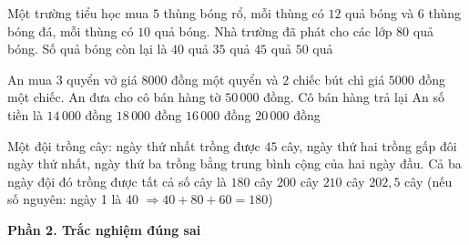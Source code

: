 \begin{ex} %
Một trường tiểu học mua $5$ thùng bóng rổ, mỗi thùng có $12$ quả bóng và $6$ thùng bóng đá, mỗi thùng có $10$ quả bóng. Nhà trường đã phát cho các lớp $80$ quả bóng. Số quả bóng còn lại là
\choice
{\True $40$ quả}
{$35$ quả}
{$45$ quả}
{$50$ quả}
\end{ex}

\begin{ex} %
An mua $3$ quyển vở giá $8000$ đồng một quyển và $2$ chiếc bút chì giá $5000$ đồng một chiếc. An đưa cho cô bán hàng tờ $50\,000$ đồng. Cô bán hàng trả lại An số tiền là
\choice
{$14\,000$ đồng}
{$18\,000$ đồng}
{\True $16\,000$ đồng}
{$20\,000$ đồng}
\end{ex}

\begin{ex} %
Một đội trồng cây: ngày thứ nhất trồng được $45$ cây, ngày thứ hai trồng gấp đôi ngày thứ nhất, ngày thứ ba trồng bằng trung bình cộng của hai ngày đầu. Cả ba ngày đội đó trồng được tất cả số cây là
\choice
{$180$ cây}
{$200$ cây}
{$210$ cây}
{\True $202{,}5$ cây (nếu số nguyên: ngày 1 là 40 $\Rightarrow 40 + 80 + 60 = 180$)}
\end{ex}

\textbf{Phần 2. Trắc nghiệm đúng sai}

